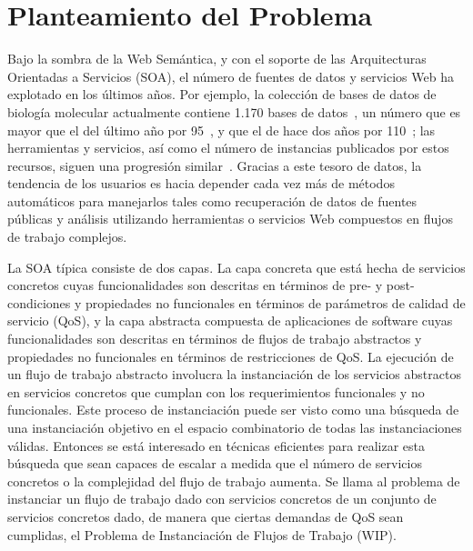 \section{Planteamiento del Problema}

Bajo la sombra de la Web Semántica, y con el soporte de las Arquitecturas Orientadas a
Servicios (SOA), el número de fuentes de datos y servicios Web ha explotado en
los últimos años. Por ejemplo, la colección de bases de datos de biología
molecular actualmente contiene 1.170 bases de datos~\cite{Galperin09}, un número
que es
mayor que el del último año por 95~\cite{Galperin2008}, y que el de hace dos
años por 110~\cite{Galperin2007};
las herramientas y servicios, así como el número de instancias
publicados por estos recursos, siguen una progresión similar~\cite{Benson07}.
Gracias a
este tesoro de datos, la tendencia de los usuarios es hacia depender cada vez
más de métodos automáticos para manejarlos tales como recuperación de datos de
fuentes públicas y análisis utilizando herramientas o servicios Web compuestos
en flujos de trabajo complejos.

La SOA típica consiste de dos capas. La capa concreta que está hecha de
servicios concretos cuyas funcionalidades son descritas en términos de pre- y
post-condiciones y propiedades no funcionales en términos de parámetros de
calidad de servicio (QoS), y
la capa abstracta compuesta de aplicaciones de software cuyas funcionalidades
son descritas en términos de flujos de trabajo abstractos y propiedades no
funcionales en términos de restricciones de QoS. La ejecución de un flujo de
trabajo abstracto involucra la instanciación de los servicios abstractos en
servicios concretos que cumplan con los requerimientos funcionales y no
funcionales. Este proceso de instanciación puede ser visto como una búsqueda de
una instanciación objetivo en el espacio combinatorio de todas las
instanciaciones válidas. Entonces se está interesado en técnicas eficientes para
realizar esta búsqueda que sean capaces de escalar a medida que el número de
servicios concretos o la complejidad del flujo de trabajo aumenta. Se llama al
problema de instanciar un flujo de trabajo dado con servicios concretos de un
conjunto de servicios concretos dado, de manera que ciertas demandas de QoS sean
cumplidas, el Problema de Instanciación de Flujos de Trabajo (WIP).

